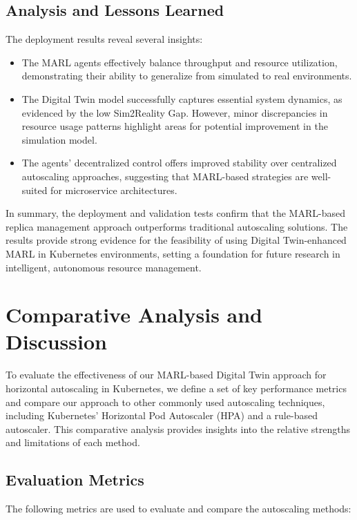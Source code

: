 \documentclass[conference]{IEEEtran}
\begin{document}
\subsection{Analysis and Lessons Learned}

The deployment results reveal several insights:
\begin{itemize}
    \item The MARL agents effectively balance throughput and resource utilization, demonstrating their ability to generalize from simulated to real environments.
    \item The Digital Twin model successfully captures essential system dynamics, as evidenced by the low Sim2Reality Gap. However, minor discrepancies in resource usage patterns highlight areas for potential improvement in the simulation model.
    \item The agents’ decentralized control offers improved stability over centralized autoscaling approaches, suggesting that MARL-based strategies are well-suited for microservice architectures.
\end{itemize}

In summary, the deployment and validation tests confirm that the MARL-based replica management approach outperforms traditional autoscaling solutions. The results provide strong evidence for the feasibility of using Digital Twin-enhanced MARL in Kubernetes environments, setting a foundation for future research in intelligent, autonomous resource management.


\section{Comparative Analysis and Discussion}
\label{sec:discussion}

To evaluate the effectiveness of our MARL-based Digital Twin approach for horizontal autoscaling in Kubernetes, we define a set of key performance metrics and compare our approach to other commonly used autoscaling techniques, including Kubernetes' Horizontal Pod Autoscaler (HPA) and a rule-based autoscaler. This comparative analysis provides insights into the relative strengths and limitations of each method.

\subsection{Evaluation Metrics}

The following metrics are used to evaluate and compare the autoscaling methods:
\end{document}
